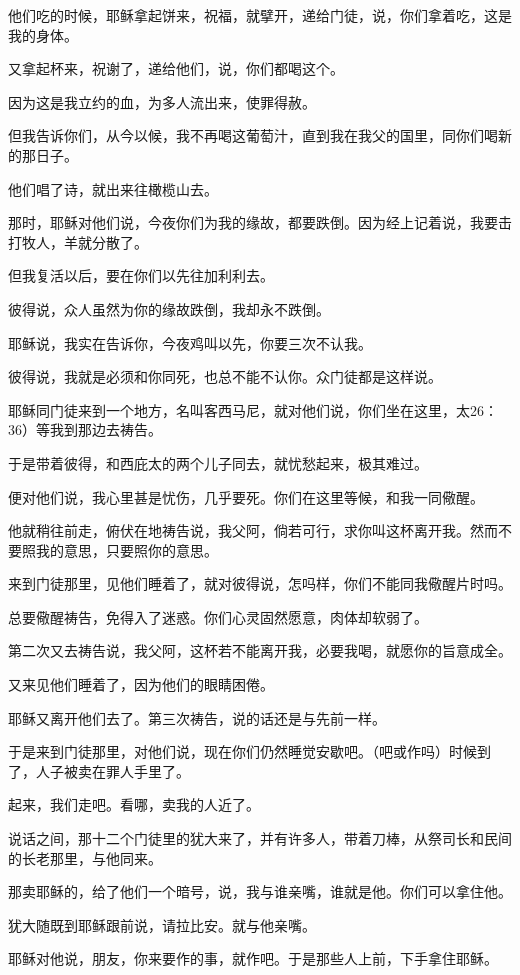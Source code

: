 \documentclass[12pt,oneside]{book}
\begin{document}
他们吃的时候，耶稣拿起饼来，祝福，就擘开，递给门徒，说，你们拿着吃，这是我的身体。

又拿起杯来，祝谢了，递给他们，说，你们都喝这个。

因为这是我立约的血，为多人流出来，使罪得赦。

但我告诉你们，从今以候，我不再喝这葡萄汁，直到我在我父的国里，同你们喝新的那日子。

他们唱了诗，就出来往橄榄山去。

那时，耶稣对他们说，今夜你们为我的缘故，都要跌倒。因为经上记着说，我要击打牧人，羊就分散了。

但我复活以后，要在你们以先往加利利去。

彼得说，众人虽然为你的缘故跌倒，我却永不跌倒。

耶稣说，我实在告诉你，今夜鸡叫以先，你要三次不认我。

彼得说，我就是必须和你同死，也总不能不认你。众门徒都是这样说。

耶稣同门徒来到一个地方，名叫客西马尼，就对他们说，你们坐在这里，太26：36）等我到那边去祷告。

于是带着彼得，和西庇太的两个儿子同去，就忧愁起来，极其难过。

便对他们说，我心里甚是忧伤，几乎要死。你们在这里等候，和我一同儆醒。

他就稍往前走，俯伏在地祷告说，我父阿，倘若可行，求你叫这杯离开我。然而不要照我的意思，只要照你的意思。

来到门徒那里，见他们睡着了，就对彼得说，怎吗样，你们不能同我儆醒片时吗。

总要儆醒祷告，免得入了迷惑。你们心灵固然愿意，肉体却软弱了。

第二次又去祷告说，我父阿，这杯若不能离开我，必要我喝，就愿你的旨意成全。

又来见他们睡着了，因为他们的眼睛困倦。

耶稣又离开他们去了。第三次祷告，说的话还是与先前一样。

于是来到门徒那里，对他们说，现在你们仍然睡觉安歇吧。（吧或作吗）时候到了，人子被卖在罪人手里了。

起来，我们走吧。看哪，卖我的人近了。

说话之间，那十二个门徒里的犹大来了，并有许多人，带着刀棒，从祭司长和民间的长老那里，与他同来。

那卖耶稣的，给了他们一个暗号，说，我与谁亲嘴，谁就是他。你们可以拿住他。

犹大随既到耶稣跟前说，请拉比安。就与他亲嘴。

耶稣对他说，朋友，你来要作的事，就作吧。于是那些人上前，下手拿住耶稣。
\end{document}
